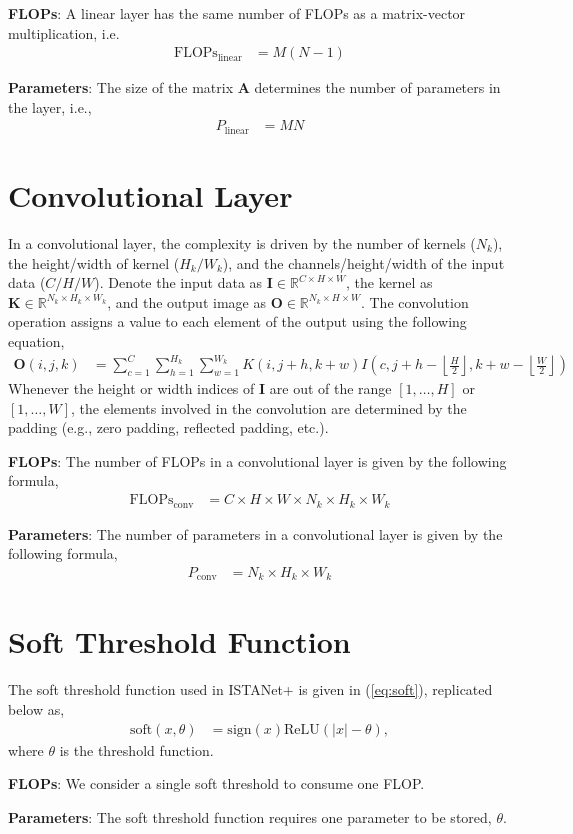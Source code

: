 \textbf{FLOPs}: A linear layer has the same number of FLOPs as a matrix-vector multiplication, i.e.
\begin{align*}
	\text{FLOPs}_{\text{linear}} &= M(N-1)
\end{align*}

\textbf{Parameters}: The size of the matrix $\mathbf{A}$ determines the number of parameters in the layer, i.e.,
\begin{align*}
	P_{\text{linear}} &= MN
\end{align*}

\section{Convolutional Layer}

In a convolutional layer, the complexity is driven by the number of kernels ($N_k$), the height/width of kernel ($H_k/W_k$), and the channels/height/width of the input data ($C/H/W$). Denote the input data as $\mathbf I\in\mathbb{R}^{C\times H\times W}$, the kernel as $\mathbf{K}\in\mathbb{R}^{N_k\times H_k\times W_k}$, and the output image as $\mathbf O\in\mathbb{R}^{N_k\times H\times W}$. The convolution operation assigns a value to each element of the output using the following equation,
\begin{align}
	\mathbf{O}(i,j,k) &= \sum_{c=1}^{C}\sum_{h=1}^{H_k}\sum_{w=1}^{W_k} K(i,j+h,k+w)I\left(c,j+h-\left\lfloor\frac{H}{2}\right\rfloor,k+w-\left\lfloor\frac{W}{2}\right\rfloor\right)
\end{align}
Whenever the height or width indices of $\mathbf{I}$ are out of the range $[1,\dots,H]$ or $[1,\dots,W]$, the elements involved in the convolution are determined by the padding (e.g., zero padding, reflected padding, etc.).

\textbf{FLOPs}: The number of FLOPs in a convolutional layer is given by the following formula,
\begin{align*}
	\text{FLOPs}_{\text{conv}} &= C\times H \times W \times N_k \times H_k \times W_k
\end{align*}

\textbf{Parameters}: The number of parameters in a convolutional layer is given by the following formula,
\begin{align*}
	P_{\text{conv}} &= N_k\times H_k\times W_k
\end{align*}

\section{Soft Threshold Function}

The soft threshold function used in ISTANet+ \cite{ref:zhang2018ista} is given in (\ref{eq:soft}), replicated below as,
\begin{align*}
    \text{soft}(x, \theta) &= \text{sign}(x)\text{ReLU}(|x|-\theta),
\end{align*}
where $\theta$ is the threshold function.

\textbf{FLOPs}: We consider a single soft threshold to consume one FLOP.

\textbf{Parameters}: The soft threshold function requires one parameter to be stored, $\theta$.